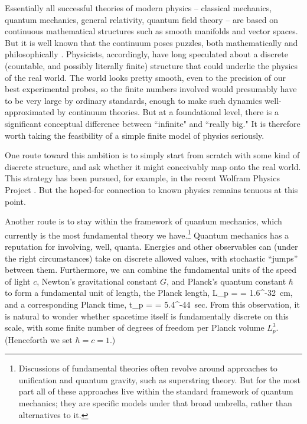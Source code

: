\documentclass[aps,prd,twocolumn,nofootinbib,notitlepage]{revtex4-1}
\begin{document}
Essentially all successful theories of modern physics -- classical mechanics, quantum mechanics, general relativity, quantum field theory -- are based on continuous mathematical structures such as smooth manifolds and vector spaces.
But it is well known that the continuum poses puzzles, both mathematically and philosophically \cite{sep-infinity}.
Physicists, accordingly, have long speculated about a discrete (countable, and possibly literally finite) structure that could underlie the physics of the real world.
The world looks pretty smooth, even to the precision of our best experimental probes, so the finite numbers involved would presumably have to be very large by ordinary standards, enough to make such dynamics well-approximated by continuum theories.
But at a foundational level, there is a significant conceptual difference between ``infinite" and ``really big."
It is therefore worth taking the feasibility of a simple finite model of physics seriously.

One route toward this ambition is to simply start from scratch with some kind of discrete structure, and ask whether it might conceivably map onto the real world.
This strategy has been pursued, for example, in the recent Wolfram Physics Project \cite{wolfram2020}.
But the hoped-for connection to known physics remains tenuous at this point.

Another route is to stay within the framework of quantum mechanics, which currently is the most fundamental theory we have.\footnote{Discussions of fundamental theories often revolve around approaches to unification and quantum gravity, such as superstring theory. But for the most part all of these approaches live within the standard framework of quantum mechanics; they are specific models under that broad umbrella, rather than alternatives to it.}
Quantum mechanics has a reputation for involving, well, quanta.
Energies and other observables can (under the right circumstances) take on discrete allowed values, with stochastic ``jumps'' between them.
Furthermore, we can combine the fundamental units of the speed of light $c$, Newton's gravitational constant $G$, and Planck's quantum constant $\hbar$ to form a fundamental unit of length, the Planck length,
\be
  L_p =  = 1.6^{-32}~\textrm{cm,}
\ee
and a corresponding Planck time,
\be
  t_p =  = 5.4^{-44}~\textrm{sec.}
\ee
From this observation, it is natural to wonder whether spacetime itself is fundamentally discrete on this scale, with some finite number of degrees of freedom per Planck volume $L_p^3$. (Henceforth we set $\hbar = c = 1$.)
\end{document}
